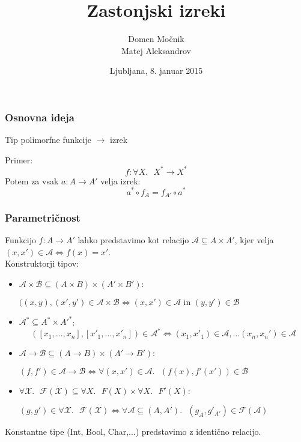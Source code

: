 \documentclass{beamer}
\title{Zastonjski izreki}
\author{Domen Močnik\\
Matej Aleksandrov}
\date{Ljubljana, 8. januar 2015}
\begin{document}
\begin{frame}
	\titlepage
	\end{frame}
	
	
	\begin{frame}
	\frametitle{Osnovna ideja}
	\begin{center}
	Tip polimorfne funkcije $\rightarrow$ izrek
	\end{center}
	\pause
	Primer:
	\\
	$$f: \forall X .\mbox{ } X^* \rightarrow X^*$$
	\pause
	Potem za vsak $a: A \rightarrow A'$ velja izrek:
	$$  a^* \circ f_{A} = f_{A'} \circ a^* $$
	\end{frame}
	
	\begin{frame}
	\frametitle{Parametričnost}
		Funkcijo $f:A \to A'$ lahko predstavimo kot relacijo $\mathcal{A} \subseteq A \times A'$, kjer velja $(x,x')\in \mathcal{A} \Leftrightarrow  f(x)=x'$.\\ \pause
		Konstruktorji tipov:\pause
		\begin{itemize}
		\item $\mathcal{A}\times \mathcal{B} \subseteq (A \times B) \times (A' \times B')$:
		 \begin{center} $((x,y),(x',y') \in \mathcal{A}\times \mathcal{B} \Leftrightarrow (x,x') \in \mathcal{A} \mbox{ in } (y,y') \in \mathcal{B} $ \end{center} \pause
		\item $\mathcal{A}^* \subseteq A^* \times A'^*$:
		$$ ([x_1, \ldots, x_n],[x'_1, \ldots, x'_n]) \in \mathcal{A}^* \Leftrightarrow (x_1,x'_1) \in \mathcal{A},  \ldots  (x_n,x_n') \in \mathcal{A} $$ \pause
		\vspace{-0.5cm}
		\item $\mathcal{A}\to \mathcal{B} \subseteq (A \to B) \times (A' \to B')$:
		 \begin{center} $ (f,f') \in \mathcal{A}\to \mathcal{B} \Leftrightarrow  \forall (x,x') \in \mathcal{A}.\mbox{ } (f(x),f'(x')) \in \mathcal{B} $  \end{center} \pause
		\item $\forall \mathcal{X}.\mbox{ } \mathcal{F}(\mathcal{X}) \subseteq \forall X.\mbox{ } F(X) \times \forall X.\mbox{ } F'(X) $:
		 \begin {center}$ (g,g') \in \forall \mathcal{X}.\mbox{ } \mathcal{F}(\mathcal{X})  \Leftrightarrow  \forall \mathcal{A} \subseteq (A,A').\mbox{ } (g_A,g'_{A'}) \in \mathcal{F}(\mathcal{A})$  \end{center}
		\end{itemize}
\pause
	Konstantne tipe (Int, Bool, Char,...) predstavimo z identično relacijo.
	\end{frame}
	
\end{document}

